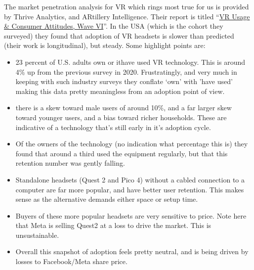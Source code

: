 The market penetration analysis for VR which rings most true for us is provided by Thrive Analytics, and ARtillery Intelligence. Their report is titled ``\href{https://artilleryiq.com/reports/vr-usage-consumer-attitudes-wave-vi/}{VR Usage \& Consumer Attitudes, Wave VI}''. In the USA (which is the cohort they surveyed) they found that adoption of VR headsets is slower than predicted (their work is longitudinal), but steady. Some highlight points are:
\begin{itemize}
\item 23 percent of U.S. adults own or it{have used} VR technology. This is around 4\% up from the previous survey in 2020. Frustratingly, and very much in keeping with such industry surveys they conflate `own' with 'have used' making this data pretty meaningless from an adoption point of view.
\item there is a skew toward male users of around 10\%, and a far larger skew toward younger users, and a bias toward richer households. These are indicative of a technology that's still early in it's adoption cycle.
\item Of the owners of the technology (no indication what percentage this is) they found that around a third used the equipment regularly, but that this retention number was gently falling.
\item Standalone headsets (Quest 2 and Pico 4) without a cabled connection to a computer are far more popular, and have better user retention. This makes sense as the alternative demands either space or setup time.
\item Buyers of these more popular headsets are very sensitive to price. Note here that Meta is selling Quest2 at a loss to drive the market. This is unsustainable.
\item Overall this snapshot of adoption feels pretty neutral, and is being driven by losses to Facebook/Meta share price.
\end{itemize}

